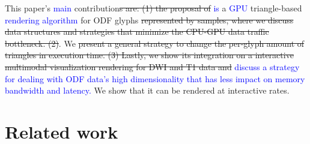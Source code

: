 \documentclass[twoside,twocolumn,10pt]{article}
\begin{document}
This paper's \textcolor{blue}{main} contribution\sout{s are: (1) the proposal of} \textcolor{blue}{is} a \textcolor{blue}{GPU} triangle-based \textcolor{blue}{rendering algorithm} for ODF glyphs\sout{ represented by samples, where we discuss data structures and strategies that minimize the CPU-GPU data traffic bottleneck. (2)}. We \sout{present a general strategy to change the per-glyph amount of triangles in execution time. (3) Lastly, we show its integration on a interactive multimodal visualization rendering for DWI and T1 data and} \textcolor{blue}{discuss a strategy for dealing with ODF data's high dimensionality that has less impact on memory bandwidth and latency.} We show that it can be rendered at interactive rates.




\section{Related work}
\label{sec::related_work}


\end{document}
